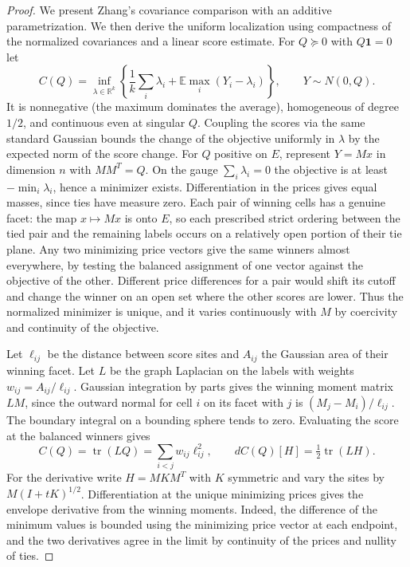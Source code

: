 \documentclass[11pt,reqno]{amsart}
\newcommand{\R}{\mathbb R}
\newcommand{\E}{\mathbb E}
\newcommand{\one}{\mathbf 1}
\DeclareMathOperator{\tr}{tr}
\begin{document}
\begin{proof}
We present Zhang's covariance comparison \cite[Sections~2--5]{Zhang}
with an additive parametrization. We then derive the uniform
localization using compactness of the normalized covariances and
a linear score estimate.
For $Q\succeq0$ with $Q\one=0$ let
\[
 C(Q)=\inf_{\lambda\in\R^k}
 \left\{\frac{1}{k}\sum_i\lambda_i+
                      \E\max_i(Y_i-\lambda_i)\right\},\qquad
 Y\sim N(0,Q).
\]
It is nonnegative (the maximum dominates the average), homogeneous
of degree $1/2$, and continuous even at singular
$Q$. Coupling the scores via the same standard Gaussian bounds the
change of the objective uniformly in $\lambda$ by the expected norm
of the score change. For $Q$ positive on $E$, represent $Y=Mx$ in
dimension $n$ with $MM^T=Q$. On the gauge $\sum_i\lambda_i=0$ the
objective is at least $-\min_i\lambda_i$, hence a minimizer exists.
Differentiation in the prices gives equal masses, since ties have
measure zero. Each pair of winning cells has a genuine facet:
the map $x\mapsto Mx$ is onto $E$, so each prescribed strict ordering
between the tied pair and the remaining labels occurs on a relatively
open portion of their tie plane. Any two minimizing price vectors
give the same winners almost everywhere, by testing the balanced
assignment of one vector against the objective of the other. Different
price differences for a pair would shift its cutoff and change the
winner on an open set where the other scores are lower. Thus the
normalized minimizer is unique, and it varies continuously with $M$
by coercivity and continuity of the objective.

Let $\ell_{ij}$ be the distance between score sites and $A_{ij}$ the
Gaussian area of their winning facet. Let $L$ be the graph Laplacian
on the labels with weights $w_{ij}=A_{ij}/\ell_{ij}$. Gaussian
integration by parts gives the winning moment matrix $LM$, since the
outward normal for cell $i$ on its facet with $j$ is
$(M_j-M_i)/\ell_{ij}$. The boundary integral on a bounding sphere
tends to zero. Evaluating the score at the balanced winners gives
\[
 C(Q)=\tr(LQ)=\sum_{i<j}w_{ij}\ell_{ij}^2,\qquad
 dC(Q)[H]=\tfrac12\tr(LH).
\]
For the derivative write $H=MKM^T$ with $K$ symmetric and vary the
sites by $M(I+tK)^{1/2}$. Differentiation at the unique minimizing
prices gives the envelope derivative from the winning moments.
Indeed, the difference of the minimum values is bounded using the
minimizing price vector at each endpoint, and the two derivatives
agree in the limit by continuity of the prices and nullity of ties.


\end{proof}
\end{document}
